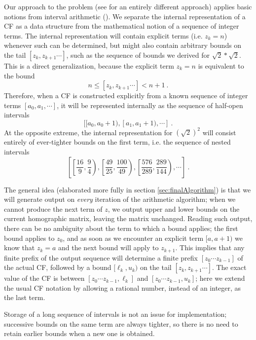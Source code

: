 \documentclass[11pt, oneside]{amsart}   	%
\renewcommand{\:}{\negthickspace:\negthickspace}
\begin{document}
Our approach to the problem (see \cite{Lester01} for an entirely different approach)
applies basic notions from interval arithmetic (\cite{doi:10.1137/1.9780898717716,Mayer+2017}).
We separate the internal representation of a CF as a data structure from the mathematical notion of a  sequence of integer terms. The
internal representation will contain explicit terms (i.e. $z_k=n$) whenever such can be determined, but might also contain arbitrary
bounds on the tail $[z_k, z_{k+1}\cdots]$, such as the  sequence of bounds we derived for $\sqrt{2}*\sqrt{2}$. This is a direct
generalization, because the explicit term  $z_k=n$ is equivalent to the bound 
\[
n \leq [z_k, z_{k+1}\cdots] < n+1 \ .
\]
Therefore, when a CF is constructed explicitly from a known sequence of integer terms $[a_0, a_1, \cdots]$,
it will be represented internally as the sequence of half-open intervals
\[
[[a_0, a_0+1),  [a_1, a_1+1), \cdots]\ .
\] 
At the opposite extreme, the internal representation for $(\sqrt{2})^2$ will consist entirely of ever-tighter bounds on the first term, i.e. the sequence of nested intervals
\[
\left[ \left[\frac{16}{9},\frac{9}{4}\right), \left[\frac{49}{25},\frac{100}{49}\right), \left[\frac{576}{289},\frac{289}{144}\right), \cdots\right ]\ .
\] 

The general idea (elaborated more fully in section \ref{sec:finalAlgorithm}) is that we will generate output on \emph{every}
 iteration of the arithmetic algorithm; when we cannot produce the next term of $z$, we output upper and lower bounds on the current
 homographic matrix, leaving the matrix unchanged. Reading such output, there can be no ambiguity about the term to which a bound 
 applies; the first bound applies to $z_0$, and as soon as we encounter an explicit term $[a,a+1)$ we know that $z_k=a$ and the next bound will apply to $z_{k+1}$. 
 This implies that any finite prefix of the output sequence will determine a finite prefix $[z_0 \cdots z_{k-1}]$ of the actual CF, followed by a bound
 $[\ell_k,u_k)$ on the tail $[z_k, z_{k+1}\cdots]$. The exact value of the CF is between $[z_0 \cdots z_{k-1}, \ell_k]$ and
 $[z_0 \cdots z_{k-1}, u_k]$; here we extend the usual CF notation by allowing a rational number, instead of an integer, as the last term.

Storage of a long sequence of intervals is not an issue for implementation;
successive bounds on the same term are always tighter, so there is no need to retain earlier bounds when a new one is obtained. 
\end{document}
